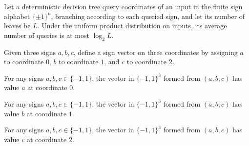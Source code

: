 \begin{theorem}
\label{FABL.FiniteDecisionTree.deterministicAverageCost_le_log_leafCount}
\leanok
{}
Let a deterministic decision tree query coordinates of an input in the finite sign
alphabet $\{\pm 1\}^n$, branching according to each queried sign, and let its number of
leaves be $L$. Under the uniform product distribution on inputs, its average number of
queries is at most $\log_2 L$.
\end{theorem}

\begin{definition}
\label{FABL.signCubeThreeOfSigns}
\leanok
{}
Given three signs $a,b,c$, define a sign vector on three coordinates by assigning $a$ to
coordinate $0$, $b$ to coordinate $1$, and $c$ to coordinate $2$.
\end{definition}

\begin{theorem}
\label{FABL.signCubeThreeOfSigns_zero}
\leanok
{}
For any signs $a,b,c\in\{−1,1\}$, the vector in $\{−1,1\}^3$ formed from $(a,b,c)$ has
value $a$ at coordinate $0$.
\end{theorem}

\begin{theorem}
\label{FABL.signCubeThreeOfSigns_one}
\leanok
{}
For any signs $a,b,c\in\{−1,1\}$, the vector in $\{−1,1\}^3$ formed from $(a,b,c)$ has
value $b$ at coordinate $1$.
\end{theorem}

\begin{theorem}
\label{FABL.signCubeThreeOfSigns_two}
\leanok
{}
For any signs $a,b,c\in\{−1,1\}$, the vector in $\{−1,1\}^3$ formed from $(a,b,c)$ has
value $c$ at coordinate $2$.
\end{theorem}

